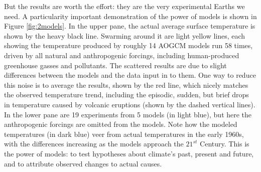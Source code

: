 But the results are worth the effort: they are the very experimental Earths we need. A particularity important demonstration of the power of models is shown in Figure \ref{fig:2models}. In the upper pane, the actual average surface temperature is shown by the heavy black line. Swarming around it are light yellow lines, each showing the temperature produced by roughly 14 AOGCM models run 58 times, driven by all natural and anthropogenic forcings, including human-produced greenhouse gasses and pollutants. The scattered results are due to slight differences between the models and the data input in to them. One way to reduce this noise is to average the results, shown by the red line, which nicely matches the observed temperature trend, including the episodic, sudden, but brief drops in temperature caused by volcanic eruptions (shown by the dashed vertical lines). In the lower pane are 19 experiments from 5 models (in light blue), but here the anthropogenic forcings are omitted from the models. Note how the modeled temperatures (in dark blue) veer from actual temperatures in the early 1960s, with the differences increasing as the models approach the $21^{st}$ Century. This is the power of models: to test hypotheses about climate's past, present and future, and to attribute observed changes to actual causes.        

